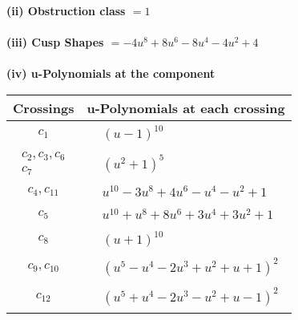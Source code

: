 \documentclass[1p]{elsarticle_modified}
\theoremstyle{definition}
\begin{document}
\flushleft \textbf{(ii) Obstruction class $= 1$}\\~\\
\flushleft \textbf{(iii) Cusp Shapes $= -4 u^8+8 u^6-8 u^4-4 u^2+4$}\\~\\
\newpage\renewcommand{\arraystretch}{1}
\flushleft \textbf{(iv) u-Polynomials at the component}\newline \\
\begin{tabular}{m{50pt}|m{274pt}}
Crossings & \hspace{64pt}u-Polynomials at each crossing \\
\hline $$\begin{aligned}c_{1}\end{aligned}$$&$\begin{aligned}
&(u-1)^{10}
\end{aligned}$\\
\hline $$\begin{aligned}c_{2},c_{3},c_{6}\\c_{7}\end{aligned}$$&$\begin{aligned}
&(u^2+1)^5
\end{aligned}$\\
\hline $$\begin{aligned}c_{4},c_{11}\end{aligned}$$&$\begin{aligned}
&u^{10}-3 u^8+4 u^6- u^4- u^2+1
\end{aligned}$\\
\hline $$\begin{aligned}c_{5}\end{aligned}$$&$\begin{aligned}
&u^{10}+u^8+8 u^6+3 u^4+3 u^2+1
\end{aligned}$\\
\hline $$\begin{aligned}c_{8}\end{aligned}$$&$\begin{aligned}
&(u+1)^{10}
\end{aligned}$\\
\hline $$\begin{aligned}c_{9},c_{10}\end{aligned}$$&$\begin{aligned}
&(u^5- u^4-2 u^3+u^2+u+1)^2
\end{aligned}$\\
\hline $$\begin{aligned}c_{12}\end{aligned}$$&$\begin{aligned}
&(u^5+u^4-2 u^3- u^2+u-1)^2
\end{aligned}$\\
\hline
\end{tabular}\\~\\
\end{document}
